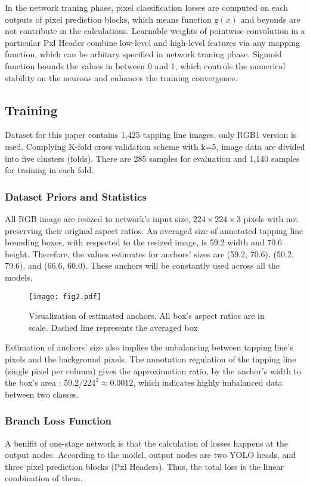 \documentclass[default,pdflatex,iicol]{sn-jnl}%
\begin{document}
In the network traning phase, pixel classification losses are computed on each outputs of pixel prediction blocks, which means function $\mathrm{g}(x)$ and beyonds are not contribute in the calculations. Learnable weights of pointwise convolution in a particular Pxl Header combine low-level and high-level features via any mapping function, which can be arbitary specified in network traning phase. Sigmoid function bounds the values in between 0 and 1, which controls the numerical stability on the neurons and enhances the training convergence.

\subsection{Training}
Dataset for this paper contains 1,425 tapping line images, only RGB1 version \cite{Wongtanawijit_2021} is used. Complying K-fold cross validation scheme with k=5, image data are divided into five clusters (folds). There are 285 samples for evaluation and 1,140 samples for training in each fold.

\subsubsection{Dataset Priors and Statistics}
All RGB image are resized to network's input size, $224\times224\times3$ pixels with not preserving their original aspect ratios. An averaged size of annotated tapping line bounding boxes, with respected to the resized image, is 59.2 width and 70.6 height. Therefore, the values estimates for anchors' sizes are (59.2, 70.6), (50.2, 79.6), and (66.6, 60.0). These anchors will be constantly used across all the models.

\begin{figure}[h]%
\centering
\texttt{[image: fig2.pdf]}
\caption{Visualization of estimated anchors. All box's aspect ratios are in scale. Dashed line represents the averaged box}\label{fig2-anchors}
\end{figure}

Estimation of anchors' size also implies the unbalancing between tapping line's pixels and the background pixels. The annotation regulation of the tapping line (single pixel per column) gives the approximation ratio, by the anchor's width to the box's area : $59.2 / 224^2 \approx 0.0012$, which indicates highly imbalanced data between two classes.

\subsubsection{Branch Loss Function}\label{subsubsec-pxlbranch}
A benifit of one-stage network is that the calculation of losses happens at the output nodes. According to the model, output nodes are two YOLO heads, and three pixel prediction blocks (Pxl Headers). Thus, the total loss is the linear combination of them.
\end{document}
